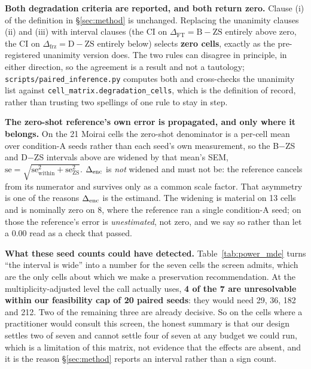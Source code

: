 \textbf{Both degradation criteria are reported, and both return zero.}  Clause (i)
of the definition in \S\ref{sec:method} is unchanged.  Replacing the unanimity
clauses (ii) and (iii) with interval clauses (the CI on
$\Delta_\text{FT}{=}\text{B}{-}\text{ZS}$ entirely above zero, the CI on
$\Delta_\text{frz}{=}\text{D}{-}\text{ZS}$ entirely below) selects
\textbf{zero cells}, exactly as the pre-registered unanimity version does.  The two
rules can disagree in principle, in either direction, so the agreement is a result
and not a tautology; \texttt{scripts/paired\_inference.py} computes both and
cross-checks the unanimity list against \texttt{cell\_matrix.degradation\_cells},
which is the definition of record, rather than trusting two spellings of one rule
to stay in step.

\textbf{The zero-shot reference's own error is propagated, and only where it
belongs.}  On the 21 Moirai cells the zero-shot denominator is a per-cell mean over
condition-A seeds rather than each seed's own measurement, so the B$-$ZS and D$-$ZS
intervals above are widened by that mean's SEM,
$\text{se}{=}\sqrt{\text{se}_\text{within}^2+\text{se}_\text{ZS}^2}$.  $\Delta_\text{enc}$ is
\emph{not} widened and must not be: the reference cancels from its numerator and
survives only as a common scale factor.  That asymmetry is one of the reasons
$\Delta_\text{enc}$ is the estimand.  The widening is material on 13 cells and is nominally
zero on 8, where the reference ran a single condition-A seed; on those the
reference's error is \emph{unestimated}, not zero, and we say so rather than let a
$0.00$ read as a check that passed.



\textbf{What these seed counts could have detected.}  Table~\ref{tab:power_mde}
turns ``the interval is wide'' into a number for the seven cells the screen admits,
which are the only cells about which we make a preservation recommendation.  At the
multiplicity-adjusted level the call actually uses, \textbf{4 of the 7 are
unresolvable within our feasibility cap of 20 paired seeds}: they would need 29,
36, 182 and 212.  Two of the remaining three are already decisive.  So on the cells
where a practitioner would consult this screen, the honest summary is that our
design settles two of seven and cannot settle four of seven at any budget we could
run, which is a limitation of this matrix, not evidence that the effects are
absent, and it is the reason \S\ref{sec:method} reports an interval rather than a
sign count.

